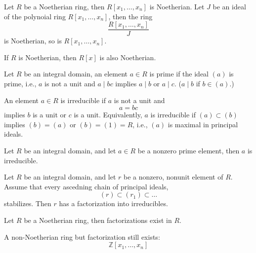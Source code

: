 \documentclass[openany]{book}
\newcommand{\Z}{\mathbb{Z}}
\begin{document}
\begin{prop}[*]
    Let $R$ be a Noetherian ring, then $R[x_1,\dots, x_n]$ is Noetherian. Let $J$ be an ideal of the polynoial ring $R[x_1,\dots, x_n]$, then the ring 
    \begin{equation*}
        \frac{R[x_1,\dots,x_n]}{J}
    \end{equation*}
    is Noetherian, so is $R[x_1,\dots, x_n]$.
\end{prop}


\begin{prop}
    If $R$ is Noetherian, then $R[x]$ is also Noetherian.
\end{prop}
\begin{defn}
    Let $R$ be an integral domain, an element $a\in R$ is prime if the ideal $(a)$ is prime, i.e., $a$ is not a unit and $a\mid bc$ implies $a\mid b$ or $a\mid c$. ($a\mid b$ if $b\in(a)$.)

    An element $a\in R$ is irreducible if $a$ is not a unit and 
    \begin{equation*}
        a=bc
    \end{equation*}
    implies $b$ is a unit or $c$ is a unit. Equivalently, $a$ is irreducible if $(a)\subset (b)$ implies $(b)=(a)$ or $(b)=(1)=R$, i.e., $(a)$ is maximal in principal ideals.
\end{defn}

\begin{prop}
    Let $R$ be an integral domain, and let $a\in R$ be a nonzero prime element, then $a$ is irreducible.
\end{prop}




\begin{prop}
    Let $R$ be an integral domain, and let $r$ be a nonzero, nonunit element of $R$. Assume that every ascedning chain of principal ideals, 
    \begin{equation*}
        (r)\subset (r_1)\subset\dots
    \end{equation*}
    stabilizes. Then $r$ has a factorization into irreducibles.
\end{prop}

\begin{cor}
    Let $R$ be a Noetherian ring, then factorizations exist in $R$.

    A non-Noetherian ring but factorization still exists:
    \begin{equation*}
        \Z[x_1,\dots,x_n]
    \end{equation*}
\end{cor}
\end{document}
